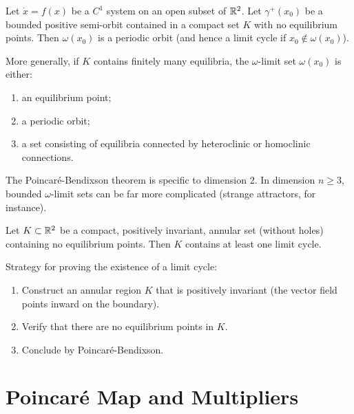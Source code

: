 \begin{theorem}
\label{thm:poincare-bendixson}
Let $\dot{x} = f(x)$ be a $C^1$ system on an open subset of $\mathbb{R}^2$. Let
$\gamma^+(x_0)$ be a bounded positive semi-orbit contained in a compact set
$K$ with no equilibrium points. Then $\omega(x_0)$ is a periodic orbit
(and hence a limit cycle if $x_0 \notin \omega(x_0)$).
\end{theorem}

\begin{remark}
More generally, if $K$ contains finitely many equilibria, the $\omega$-limit
set $\omega(x_0)$ is either:
\begin{enumerate}
    \item an equilibrium point;
    \item a periodic orbit;
    \item a set consisting of equilibria connected by heteroclinic or
    homoclinic connections.
\end{enumerate}
\end{remark}

\begin{warning}[title=\textbf{Dimension 2 only}]
The Poincar\'e-Bendixson theorem is specific to dimension 2. In dimension
$n \geq 3$, bounded $\omega$-limit sets can be far more complicated (strange
attractors, for instance).
\end{warning}

\begin{corollary}
Let $K \subset \mathbb{R}^2$ be a compact, positively invariant, annular set (without
holes) containing no equilibrium points. Then $K$ contains at least one
limit cycle.
\end{corollary}

\begin{intuition}
Strategy for proving the existence of a limit cycle:
\begin{enumerate}
    \item Construct an annular region $K$ that is positively invariant (the
    vector field points inward on the boundary).
    \item Verify that there are no equilibrium points in $K$.
    \item Conclude by Poincar\'e-Bendixson.
\end{enumerate}
\end{intuition}

\section{Poincar\'e Map and Multipliers}

